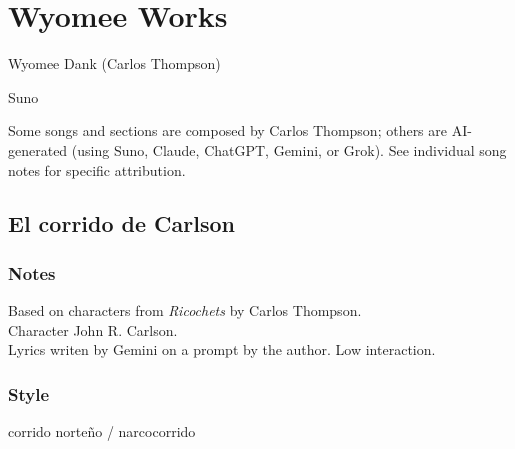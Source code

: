 \chapter{Wyomee Works}

\begin{description}
\item{} Wyomee Dank (Carlos Thompson)
\item{} Suno
\item{} Some songs and sections are composed by Carlos Thompson; others are AI-generated (using Suno, Claude, ChatGPT, Gemini, or Grok). See individual song notes for specific attribution.
\end{description}

\sepbar

\section{El corrido de Carlson}

\subsection{Notes}
Based on characters from \emph{Ricochets} by Carlos Thompson.\\
Character John R. Carlson.\\
Lyrics writen by Gemini on a prompt by the author. Low interaction.

\subsection{Style}
corrido norteño / narcocorrido

